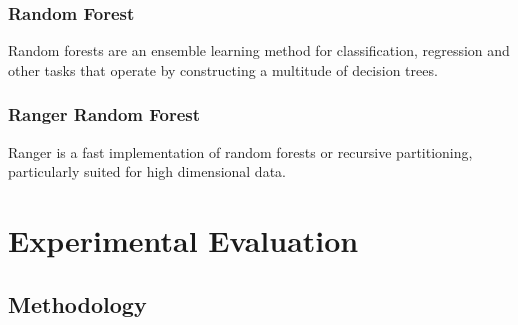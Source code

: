 \documentclass{FR16}
\begin{document}
 \subsubsection{Random Forest}
 Random forests are an ensemble learning method for classification, regression and other tasks that operate by constructing a multitude of decision trees.
 \subsubsection{Ranger Random Forest}
Ranger is a fast implementation of random forests or recursive partitioning, particularly suited for high dimensional data. 

 
\newpage
\section{Experimental Evaluation}

\subsection{Methodology}
\end{document}
